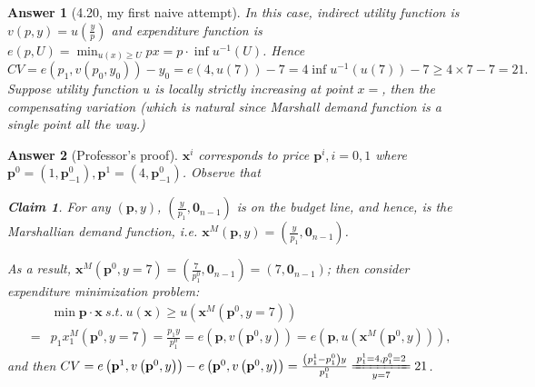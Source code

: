 \documentclass{article}
\newtheorem*{ans}{Answer}
\newtheorem{claim}{Claim}
\newcommand{\1}{{\bf 1}}
\newcommand{\0}{{\mathbf{0}}}
\newcommand{\p}{{\mathbf{p}}}
\newcommand{\x}{{\mathbf{x}}}
\newcommand{\<}{\langle}
\renewcommand{\>}{\rangle}
\newcommand{\dps}{\displaystyle}
\begin{document}
\begin{ans}[4.20, my first naive attempt] 
	 In this case, indirect utility function is $v(p,y) = u\left(\frac{y}p\right)$ and expenditure function is $\dps e(p,U) = \min_{u\left( x \right) \ge U} px = p \cdot \inf u^{-1} (U)$. Hence 
	 $$CV = e(p_1,v(p_0,y_0)) - y_0= e(4,u(7)) - 7 = 4 \inf u^{-1}\left(u (7)\right) - 7 \ge 4 \times 7-7= 21.$$
 Suppose utility function $u$ is locally strictly increasing at point $x = $, then the  compensating variation (which is natural since Marshall demand function is a single point all the way.)
\end{ans}

\begin{ans}[Professor's proof] $\x^i$ corresponds to price $\p^i, i=0,1$ where $\p^0  = \left( 1, \p^0_{-1} \right), \p^1  = \left( 4, \p^0_{-1} \right)$. Observe that 
	\begin{mdframed}
\begin{claim}
	For any $(\p, y)$, $\left( \frac{y}{p_1},\0_{n - 1} \right) $ is on the budget line, and hence, is the Marshallian demand function, i.e. $\x^M (\p, y) = \left( \frac{y}{p_1},\0_{n - 1} \right)$.
\end{claim}
	\end{mdframed}

As a result, $\x^M (\p^0, y= 7 ) = \left( \frac{7}{p_1^0},\0_{n - 1} \right) = (7,\0_{n-1})$; then consider expenditure minimization problem:
\begin{eqnarray*}
&& \min \p\cdot \x ~ s.t. ~u( \x ) \ge u\left(\x^M \left(\p^0, y=7 \right) \right) \\
& = & p_1 x^M_1 \left(\p^0, y=7 \right) = \frac{p_1  y}{p_1^0} = e\left( \p , v\left( \p^0, y\right) \right) = e\left( \p , u\left(\x^M\left( \p^0, y\right) \right)\right),
\end{eqnarray*}
and then $CV =e\left( \p^1 , v\left( \p^0, y\right) \right)  - e\left( \p^0 , v\left( \p^0, y\right) \right) =  \frac{\left(p_1^1 - p_1^0 \right) y}{p_1^0} \xlongequal[y = 7]{p_1^1 = 4,p_1^0 = 2} 21$.
\end{ans}
\end{document}
